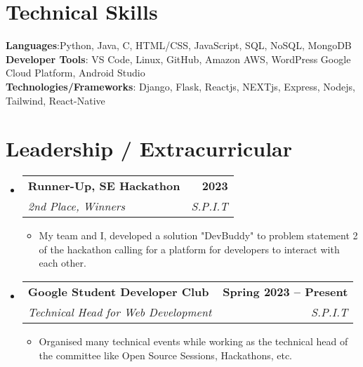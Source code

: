 \documentclass[letterpaper,11pt]{article}
\makeatletter
\newcommand{\resumeItem}[1]{
  \item\small{
    {#1 \vspace{-2pt}}
  }
}
\newcommand{\resumeSubheading}[4]{
  \vspace{-2pt}\item
    \begin{tabular*}{1.0\textwidth}[t]{l@{\extracolsep{\fill}}r}
      \textbf{#1} & \textbf{\small #2} \\
      \textit{\small#3} & \textit{\small #4} \\
    \end{tabular*}\vspace{-7pt}
}
\newcommand{\resumeSubHeadingListStart}{\begin{itemize}[leftmargin=0.0in, label={}]}
\newcommand{\resumeSubHeadingListEnd}{\end{itemize}}
\newcommand{\resumeItemListStart}{\begin{itemize}}
\newcommand{\resumeItemListEnd}{\end{itemize}\vspace{-5pt}}
\makeatother
\begin{document}
%
\section{Technical Skills}
 \begin{itemize}[leftmargin=0.15in, label={}]
    \small{\item{
     \textbf{Languages}{:Python, Java, C, HTML/CSS, JavaScript, SQL, NoSQL, MongoDB} \\
     \textbf{Developer Tools}{: VS Code, Linux, GitHub, Amazon AWS, WordPress Google Cloud Platform, Android Studio} \\
     \textbf{Technologies/Frameworks}{: Django, Flask, Reactjs, NEXTjs, Express, Nodejs, Tailwind, React-Native} \\
    }}
 \end{itemize}
 \vspace{-16pt}


\section{Leadership / Extracurricular}
    \resumeSubHeadingListStart
        \resumeSubheading{Runner-Up, SE Hackathon}{2023}
        {2nd Place, Winners}{S.P.I.T}
        \resumeItemListStart
            \resumeItem{My team and I, developed a solution "DevBuddy" to problem statement 2 of the hackathon calling for a platform for developers to interact with each other.}
            \resumeItemListEnd
        \resumeSubheading{Google Student Developer Club}{Spring 2023 -- Present}{Technical Head for Web Development}{S.P.I.T}
            \resumeItemListStart
                \resumeItem{Organised many technical events while working as the technical head of the committee like Open Source Sessions, Hackathons, etc.}
            \resumeItemListEnd
    \resumeSubHeadingListEnd
\end{document}
